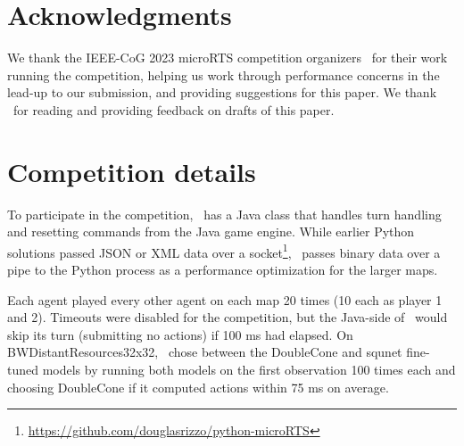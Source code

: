 \documentclass[conference]{IEEEtran}
\newcommand{\mapname}[1]{#1} %
\begin{document}
\ifcogfinal
    \section*{Acknowledgments}
    We thank the IEEE-CoG 2023 microRTS competition organizers \CompetitionOrganizers\ for
    their work running the competition, helping us work through performance concerns in the
    lead-up to our submission, and providing suggestions for this paper. We thank \ChangLiu\
    for reading and providing feedback on drafts of this paper.
\else
\fi




\appendices
\section{Competition details}

To participate in the competition, \agentName\ has a Java class that handles turn
handling and resetting commands from the Java game engine. While earlier Python
solutions  passed JSON or XML data over a
socket\footnote{\url{https://github.com/douglasrizzo/python-microRTS}}, \agentName\
passes binary data over a pipe to the Python process as a performance optimization for
the larger maps.

Each agent played every other agent on each map 20 times (10 each as player 1 and 2).
Timeouts were disabled for the competition, but the Java-side of \agentName\ would skip
its turn (submitting no actions) if 100 ms had elapsed. On
\mapname{BWDistantResources32x32}, \agentName\ chose between the DoubleCone and squnet
fine-tuned models by running both models on the first observation 100 times each and
choosing DoubleCone if it computed actions within 75 ms on average.
\end{document}
